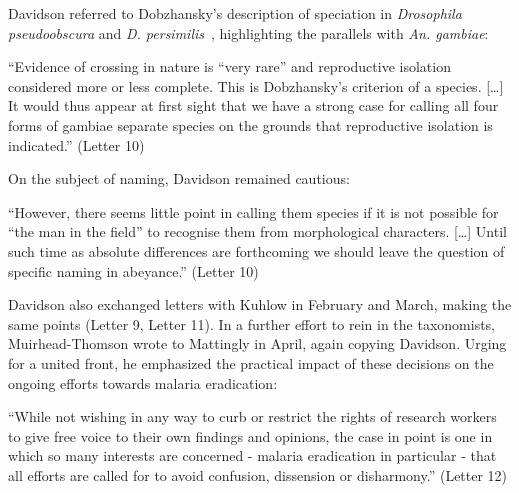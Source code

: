 \begin{refsection}
Davidson referred to Dobzhansky's description of speciation in \textit{Drosophila pseudoobscura} and \textit{D. persimilis}~\parencite{Dobzhansky1951}, highlighting the parallels with \textit{An. gambiae}:


\begin{displayquote}
``Evidence of crossing in nature is ``very rare'' and reproductive isolation considered more or less complete. This is Dobzhansky's criterion of a species. [\ldots] It would thus appear at first sight that we have a strong case for calling all four forms of gambiae separate species on the grounds that reproductive isolation is indicated.'' (Letter 10)
\end{displayquote}


On the subject of naming, Davidson remained cautious:


\begin{displayquote}
``However, there seems little point in calling them species if it is not possible for ``the man in the field'' to recognise them from morphological characters. [\ldots] Until such time as absolute differences are forthcoming we should leave the question of specific naming in abeyance.'' (Letter 10)
\end{displayquote}


Davidson also exchanged letters with Kuhlow in February and March, making the same points (Letter 9, Letter 11).
%
In a further effort to rein in the taxonomists, Muirhead-Thomson wrote to Mattingly in April, again copying Davidson.
%
Urging for a united front, he emphasized the practical impact of these decisions on the ongoing efforts towards malaria eradication:


\begin{displayquote}
``While not wishing in any way to curb or restrict the rights of research workers to give free voice to their own findings and opinions, the case in point is one in which so many interests are concerned - malaria eradication in particular - that all efforts are called for to avoid confusion, dissension or disharmony.'' (Letter 12)
\end{displayquote}



\end{refsection}

